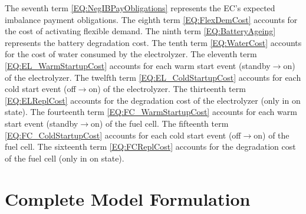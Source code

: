 \documentclass{article}
\begin{document}
The seventh term \eqref{EQ:NegIBPayObligations} represents the EC's expected
imbalance payment obligations. The eighth term \eqref{EQ:FlexDemCost} accounts
for the cost of activating flexible demand. The ninth term
\eqref{EQ:BatteryAgeing} represents the battery degradation cost. The tenth
term \eqref{EQ:WaterCost} accounts for the cost of water consumed by the
electrolyzer. The eleventh term \eqref{EQ:EL_WarmStartupCost} accounts for each
warm start event (standby$\rightarrow$on) of the electrolyzer. The twelfth term
\eqref{EQ:EL_ColdStartupCost} accounts for each cold start event
(off$\rightarrow$on) of the electrolyzer. The thirteenth term
\eqref{EQ:ELReplCost} accounts for the degradation cost of the electrolyzer
(only in on state). The fourteenth term \eqref{EQ:FC_WarmStartupCost} accounts
for each warm start event (standby$\rightarrow$on) of the fuel cell. The
fifteenth term \eqref{EQ:FC_ColdStartupCost} accounts for each cold start event
(off$\rightarrow$on) of the fuel cell. The sixteenth term \eqref{EQ:FCReplCost}
accounts for the degradation cost of the fuel cell (only in on state).
\section{Complete Model Formulation}
\label{SEC:CompleteModel}
\end{document}
